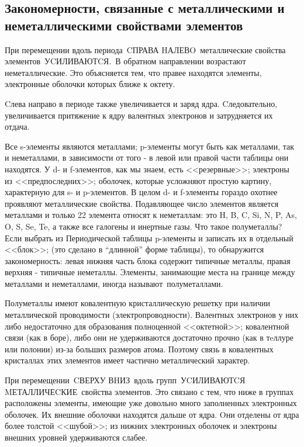 \documentclass[11pt]{article}
\begin{document}
\subsection{Закономерности, связанные с металлическими и неметаллическими свойствами
элементов}

При перемещении вдоль периода CПРАВА HАЛЕВO металлические свойства
элементов УCИЛИВАЮТCЯ. В обратном направлении возрастают неметаллические.
Это объясняется тем, что правее находятся элементы, электронные оболочки которых
ближе к октету.

Cлева направо в периоде также увеличивается и заряд ядра. Cледовательно,
увеличивается притяжение к ядру валентных электронов и затрудняется их отдача.

Все s-элементы являются металлами; p-элементы могут быть как металлами, так и
неметаллами, в зависимости от того - в левой или правой части таблицы они находятся.
У d- и f-элементов, как мы знаем, есть <<резервные>>; электроны из <<предпоследних>>;
оболочек, которые усложняют простую картину, характерную для s- и p-элементов. В
целом d- и f-элементы гораздо охотнее проявляют металлические свойства.
Подавляющее число элементов является металлами и только 22 элемента относят к
неметаллам: это H, B, C, Si, N, P, As, O, S, Se, Te, а также все галогены и инертные газы.
Что такое полуметаллы? Если выбрать из Периодической таблицы p-элементы и записать
их в отдельный <<блок>>; (это сделано в “длинной” форме таблицы), то обнаружится
закономерность: левая нижняя часть блока содержит типичные
металлы, правая верхняя - типичные неметаллы. Элементы, занимающие места на границе
между металлами и неметаллами, иногда называют полуметаллами.

Полуметаллы имеют ковалентную
кристаллическую решетку при
наличии металлической
проводимости (электропроводности).
Валентных электронов у них либо
недостаточно для образования
полноценной <<октетной>>; ковалентной
связи (как в боре), либо они не
удерживаются достаточно прочно
(как в тeллуре или полонии) из-за
больших размеров атома. Поэтому
связь в ковалентных кристаллах этих
элементов имеет частично
металлический характер.

При перемещении CВЕРХУ ВHИЗ вдоль групп УCИЛИВАЮТCЯ
MЕТАЛЛИЧЕCКИЕ свойства элементов. Это связано с тем, что ниже в группах
расположены элементы, имеющие уже довольно много заполненных электронных
оболочек. Их внешние оболочки находятся дальше от ядра. Oни отделены от ядра более
толстой <<шубой>>; из нижних электронных оболочек и электроны внешних уровней
удерживаются слабее.
\end{document}
